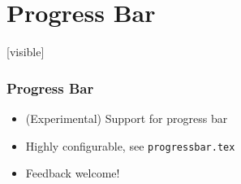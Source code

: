 \section{Progress Bar}

{%
[visible]%
%
\begin{frame}[fragile]
    \frametitle{Progress Bar}
    \begin{itemize}
        \item (Experimental) Support for progress bar
        \item Highly configurable, see \verb+progressbar.tex+
        \item Feedback welcome!
    \end{itemize}
\end{frame}
}
